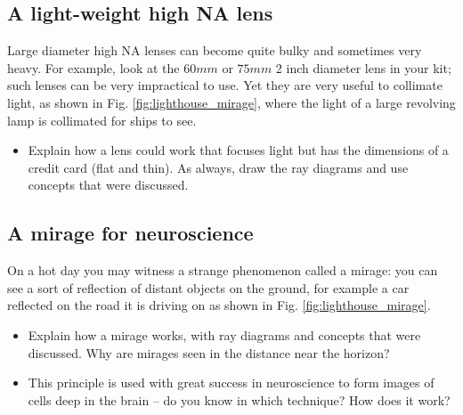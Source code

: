 \documentclass[a4paper]{report}
\begin{document}
    
    
    \subsection{A light-weight high NA lens}
	\hypertarget{hintBack-fresnel}{}
	
	Large diameter high NA lenses can become quite bulky and sometimes very heavy. For example, look at the $60mm$ or $75mm$ 2 inch diameter lens in your kit; such lenses can be very impractical to use. Yet they are very useful to collimate light, as shown in Fig. \ref{fig:lighthouse_mirage}, where the light of a large revolving lamp is collimated for ships to see.
	
	\begin{itemize}
	    \item Explain how a lens could work that focuses light but has the dimensions of a credit card (flat and thin). As always, draw the ray diagrams and use concepts that were discussed.
	\end{itemize}


	

    \subsection{A mirage for neuroscience}
	\hypertarget{hintBack-mirage}{}
	
	On a hot day you may witness a strange phenomenon called a mirage: you can see a sort of reflection of distant objects on the ground, for example a car reflected on the road it is driving on as shown in Fig. \ref{fig:lighthouse_mirage}. 
	
	\begin{itemize}
	    \item Explain how a mirage works, with ray diagrams and concepts that were discussed. Why are mirages seen in the distance near the horizon?
	    \item This principle is used with great success in neuroscience to form images of cells deep in the brain -- do you know in which technique? How does it work?
	\end{itemize}

	
	
\end{document}
